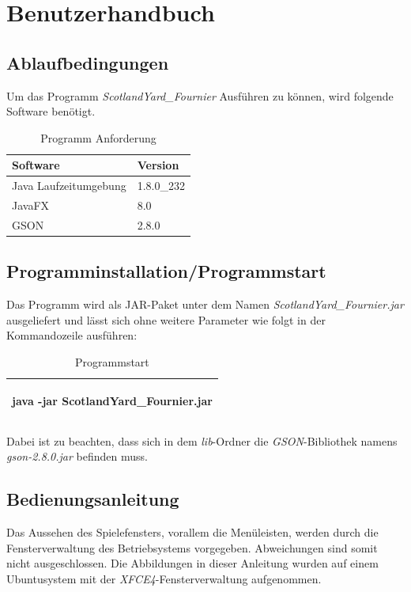 \chapter{Benutzerhandbuch}

    \section{Ablaufbedingungen}
        Um das Programm \textit{ScotlandYard\_Fournier} Ausführen zu können, wird
        folgende Software benötigt.
        \begin{table}[H]
            \caption{Programm Anforderung}
            \begin{tabular}{p{6cm}  p{6cm}} 
                \hline
                \textbf{Software} & \textbf{Version}\\
                \hline
                Java Laufzeitumgebung & 1.8.0\_232\\
                JavaFX & 8.0\\
                GSON & 2.8.0\\
                \hline
            \end{tabular}
        \end{table}
    \section{Programminstallation/Programmstart}
        Das Programm wird als JAR-Paket unter dem Namen \textit{ScotlandYard\_Fournier.jar}
        ausgeliefert und lässt sich ohne weitere Parameter wie folgt in der Kommandozeile
        ausführen:
            \begin{table}[H]
                \caption{Programmstart}
                \begin{tabular}{m{12cm}} 
                    \hline
                    \begin{center}
                        java -jar ScotlandYard\_Fournier.jar    
                    \end{center}
                    \\
                    \hline
                \end{tabular}
            \end{table}
        Dabei ist zu beachten, dass sich in dem \textit{lib}-Ordner die \textit{GSON}-Bibliothek namens \textit{gson-2.8.0.jar} befinden muss.
    \section{Bedienungsanleitung}
        Das Aussehen des Spielefensters, vorallem die Menüleisten, werden durch die
        Fensterverwaltung des Betriebsystems vorgegeben.
        Abweichungen sind somit nicht ausgeschlossen. Die Abbildungen in dieser Anleitung
        wurden auf einem Ubuntusystem mit der \textit{XFCE4}-Fensterverwaltung aufgenommen.
